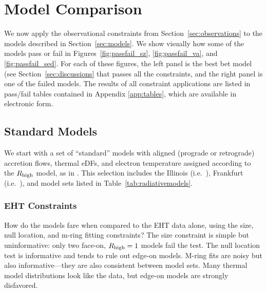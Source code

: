 \section{Model Comparison}\label{sec:comparisons}

We now apply the observational constraints from
Section~\ref{sec:observations} to the models described in
Section~\ref{sec:models}.
We show visually how some of the models pass or fail in
Figures~\ref{fig:passfail_sz}, \ref{fig:passfail_va}, and
\ref{fig:passfail_sed}.
For each of these figures, the left panel is the best bet model (see
Section~\ref{sec:discussions} that passes all the constraints, and the
right panel is one of the failed models.
The results of all constraint applications are listed in pass/fail
tables contained in Appendix \ref{app:tables}, which are available in
electronic form.

\subsection{Standard Models}\label{subsec:thermal}


We start with a set of ``standard'' models with aligned (prograde or retrograde) accretion flows, thermal eDFs, and electron temperature assigned according to the $R_\mathrm{high}$ model, as in .  This selection includes the Illinois (i.e.\ \kharma), Frankfurt (i.e.\ \bhac), and \hamr model sets listed in Table~\ref{tab:radiativemodels}.

\subsubsection{EHT Constraints}

How do the models fare when compared to the EHT data alone, using the size, null location, and m-ring fitting constraints?  The size constraint is simple but uninformative: only two face-on, $R_\mathrm{high} = 1$ models fail the test.  The null location test is informative and tends to rule out edge-on models.  M-ring fits are noisy but also informative---they are also consistent between model sets.  Many thermal model distributions look like the data, but edge-on models are strongly disfavored.

